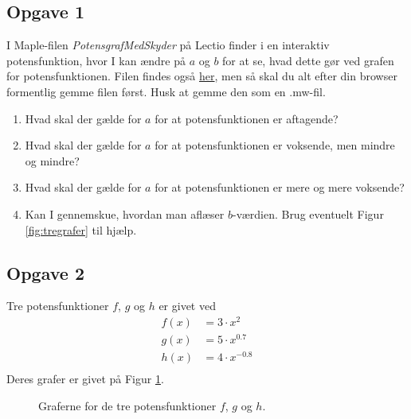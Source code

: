 \subsection*{Opgave 1}
I Maple-filen \textit{PotensgrafMedSkyder} på Lectio finder i en interaktiv potensfunktion, hvor I kan ændre på $a$ og $b$ for at se, hvad dette gør ved grafen for potensfunktionen. Filen findes også \href{https://raw.githubusercontent.com/ChristianJLex/TeachingNotes/master/2023-2024/Moduler1m/V%C3%A6kst_diverse/PotensgrafMedSkyder.mw}{\color{blue!60} her}, men så skal du alt efter din browser formentlig gemme filen først. Husk at gemme den som en .mw-fil.
\begin{enumerate}[label=\roman*)]
	\item Hvad skal der gælde for $a$ for at potensfunktionen er aftagende?
	\item Hvad skal der gælde for $a$ for at potensfunktionen er voksende, men mindre og mindre?
	\item Hvad skal der gælde for $a$ for at potensfunktionen er mere og mere voksende?
	\item Kan I gennemskue, hvordan man aflæser $b$-værdien. Brug eventuelt Figur \ref{fig:tregrafer} til hjælp.
\end{enumerate} 

\subsection*{Opgave 2}
Tre potensfunktioner $f$, $g$ og $h$ er givet ved
\begin{align*}
	f(x) &= 3\cdot x ^2\\
	g(x) &= 5\cdot x^{0.7}\\
	h(x) &= 4\cdot x^{-0.8}\\
\end{align*}
Deres grafer er givet på Figur \ref{fig:potensgrafer}.
\begin{figure}[H]
	\centering
	\caption{Graferne for de tre potensfunktioner $f$, $g$ og $h$.}
	\label{fig:potensgrafer}
\end{figure}


